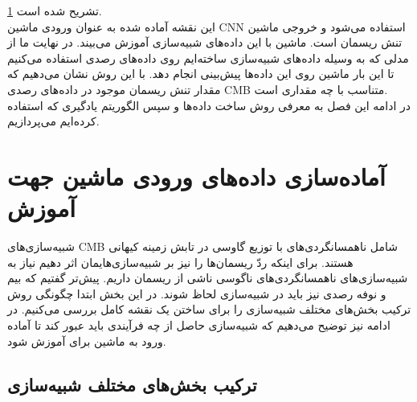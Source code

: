 \ref{sec:data_preparation}
تشریح شده است. 
\\
این نقشه آماده شده به عنوان ورودی ماشین CNN استفاده می‌شود و خروجی ماشین تنش ریسمان است. ماشین با این داده‌های شبیه‌سازی آموزش می‌بیند. در نهایت ما از مدلی که به وسیله داده‌های شبیه‌سازی ساخته‌ایم روی داده‌های رصدی استفاده می‌کنیم تا این بار ماشین روی این داده‌ها پیش‌بینی انجام دهد. با این روش نشان می‌دهیم که مقدار تنش ریسمان موجود در داده‌های رصدی CMB متناسب با چه مقداری است.
\\
در ادامه این فصل به معرفی روش ساخت داده‌ها و سپس الگوریتم یادگیری که استفاده کرده‌ایم می‌پردازیم. 




  
\section{آماده‌سازی داده‌های ورودی ماشین جهت آموزش}
\label{sec:data_preparation}

شبیه‌سازی‌های CMB شامل ناهمسانگردی‌های با توزیع گاوسی در تابش زمینه کیهانی هستند. برای اینکه ردّ ریسمان‌ها را نیز بر شبیه‌سازی‌هایمان اثر دهیم نیاز به شبیه‌سازی‌های ناهمسانگردی‌های ناگوسی ناشی از ریسمان داریم. پیش‌تر گفتیم که بیم و نوفه رصدی نیز باید در شبیه‌سازی لحاظ شوند. در این بخش ابتدا چگونگی روش ترکیب بخش‌های مختلف شبیه‌سازی را برای ساختن یک نقشه کامل بررسی می‌کنیم. در ادامه نیز توضیح می‌دهیم که شبیه‌سازی حاصل از چه فرآیندی باید عبور کند تا آماده ورود به ماشین برای آموزش شود. 

\subsection{ترکیب بخش‌های مختلف شبیه‌سازی}
\label{subsec:combine_sims}

